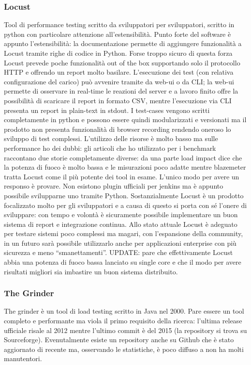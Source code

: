 \subsubsection{Locust}
Tool di performance testing scritto da sviluppatori per sviluppatori, scritto in python con particolare attenzione all’estensibilità. Punto forte del software è appunto l’estensibilità: la documentazione permette di aggiungere funzionalità a Locust tramite righe di codice in Python. Forse troppo sicuro di questa forza Locust prevede poche funzionalità out of the box supportando solo il protocollo HTTP e offrendo un report molto basilare. L’esecuzione dei test (con relativa configurazione del carico) può avvenire tramite da web-ui o da CLI; la web-ui permette di osservare in real-time le reazioni del server e a lavoro finito offre la possibilità di scaricare il report in formato CSV, mentre l’esecuzione via CLI presenta un report in plain-text in stdout.
I test-cases vengono scritti completamente in python e possono essere quindi modularizzati e versionati ma il prodotto non presenta funzionalità di browser recording rendendo oneroso lo sviluppo di test complessi.
L’utilizzo delle risorse è molto basso ma sulle performance ho dei dubbi: gli articoli che ho utilizzato per i benchmark raccontano due storie completamente diverse: da una parte load impact dice che la potenza di fuoco è molto bassa e le misurazioni poco adatte mentre blazemeter tratta Locust come il più potente dei tool in esame. L’unico modo per avere un responso è provare.
Non esistono plugin ufficiali per jenkins ma è appunto possibile svilupparne uno tramite Python.
Sostanzialmente Locust è un prodotto focalizzato molto per gli sviluppatori e a causa di questo si porta con sé l’onere di sviluppare: con tempo e volontà è sicuramente possibile implementare un buon sistema di report e integrazione continua.
Allo stato attuale Locust è adeguato per testare sistemi poco complessi ma magari, con l’espansione della community, in un futuro sarà possibile utilizzarlo anche per applicazioni enterprise con più sicurezza e meno “smanettamenti”.
UPDATE: pare che effettivamente Locust abbia una potenza di fuoco bassa lanciato su single core e che il modo per avere risultati migliori sia imbastire un buon sistema distribuito.
\subsubsection{The Grinder}
The grinder è un tool di load testing scritto in Java nel 2000. Pare essere un tool completo e performante ma viola il primo requisito della ricerca: l’ultima release ufficiale risale al 2012 mentre l’ultimo commit è del 2015 (la repository si trova su Sourceforge).
Evenutalmente esiste un repository anche su Github che è stato aggiornato di recente ma, osservando le statistiche, è poco diffuso a non ha molti manutentori.
